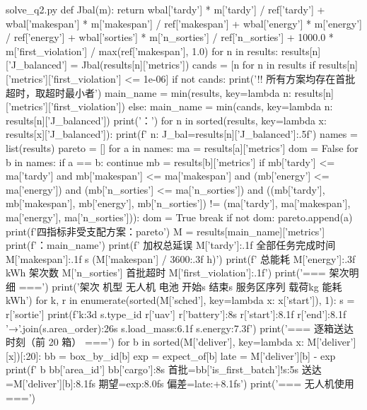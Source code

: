 \documentclass[bwprint]{gmcmthesis}
\begin{document}
\begin{appendices}
\begin{Python}{solve\_q2.py}
    def Jbal(m):
        return wbal['tardy'] * m['tardy'] / ref['tardy'] + wbal['makespan'] * m['makespan'] / ref['makespan'] + wbal['energy'] * m['energy'] / ref['energy'] + wbal['sorties'] * m['n_sorties'] / ref['n_sorties'] + 1000.0 * m['first_violation'] / max(ref['makespan'], 1.0)
    for n in results:
        results[n]['J_balanced'] = Jbal(results[n]['metrics'])
    cands = [n for n in results if results[n]['metrics']['first_violation'] <= 1e-06]
    if not cands:
        print('!! 所有方案均存在首批超时，取超时最小者')
        main_name = min(results, key=lambda n: results[n]['metrics']['first_violation'])
    else:
        main_name = min(cands, key=lambda n: results[n]['J_balanced'])
    print('：')
    for n in sorted(results, key=lambda x: results[x]['J_balanced']):
        print(f'  {n}: J_bal={results[n]['J_balanced']:.5f}')
    names = list(results)
    pareto = []
    for a in names:
        ma = results[a]['metrics']
        dom = False
        for b in names:
            if a == b:
                continue
            mb = results[b]['metrics']
            if mb['tardy'] <= ma['tardy'] and mb['makespan'] <= ma['makespan'] and (mb['energy'] <= ma['energy']) and (mb['n_sorties'] <= ma['n_sorties']) and ((mb['tardy'], mb['makespan'], mb['energy'], mb['n_sorties']) != (ma['tardy'], ma['makespan'], ma['energy'], ma['n_sorties'])):
                dom = True
                break
        if not dom:
            pareto.append(a)
    print(f'四指标非受支配方案：{pareto}')
    M = results[main_name]['metrics']
    print(f'：{main_name}')
    print(f'  加权总延误 {M['tardy']:.1f}  全部任务完成时间 {M['makespan']:.1f} s ({M['makespan'] / 3600:.3f} h)')
    print(f'  总能耗 {M['energy']:.3f} kWh  架次数 {M['n_sorties']}  首批超时 {M['first_violation']:.1f}')
    print('\n=== 架次明细 ===')
    print('架次  机型 无人机 电池     开始s    结束s   服务区序列                 载荷kg 能耗kWh')
    for k, r in enumerate(sorted(M['sched'], key=lambda x: x['start']), 1):
        s = r['sortie']
        print(f'{k:3d}   {s.type_id}   {r['uav']}   {r['battery']:8s} {r['start']:8.1f} {r['end']:8.1f}   {'→'.join(s.area_order):26s} {s.load_mass:6.1f} {s.energy:7.3f}')
    print('\n=== 逐箱送达时刻（前 20 箱） ===')
    for b in sorted(M['deliver'], key=lambda x: M['deliver'][x])[:20]:
        bb = box_by_id[b]
        exp = expect_of[b]
        late = M['deliver'][b] - exp
        print(f'  {b}  {bb['area_id']}  {bb['cargo']:8s} 首批={bb['is_first_batch']!s:5s} 送达={M['deliver'][b]:8.1f}s 期望={exp:8.0f}s 偏差={late:+8.1f}s')
    print('\n=== 无人机使用 ===')

\end{Python}
\end{appendices}
\end{document}
